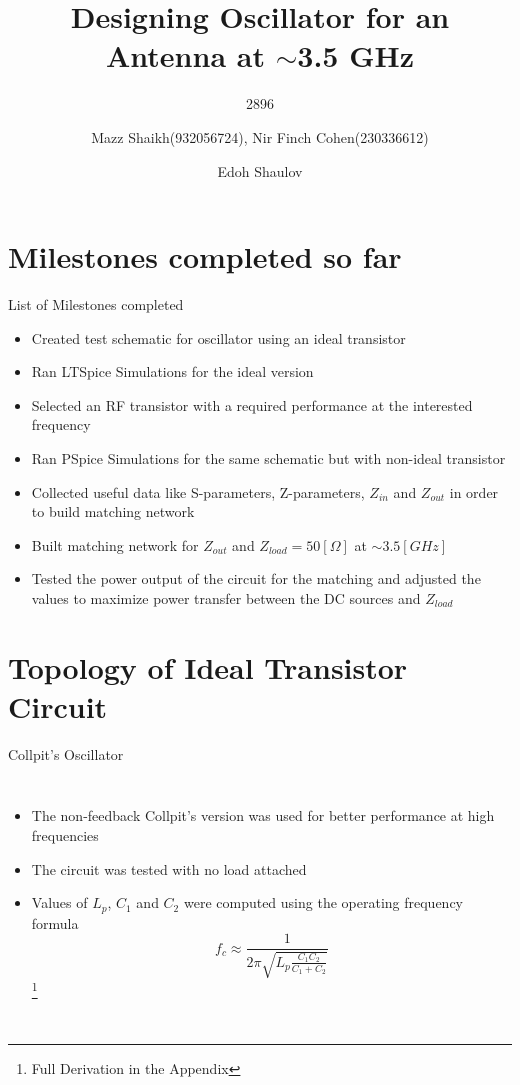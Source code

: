 \documentclass{beamer}
\title{Designing Oscillator for an Antenna at \(\sim\)3.5 GHz}
\date{}
\subtitle{2896}
\author{Mazz Shaikh(932056724), Nir Finch Cohen(230336612)}
\date{Edoh Shaulov}
\institute{Tel Aviv University}
\begin{document}
\maketitle


\section{Milestones completed so far}

\begin{frame}{List of Milestones completed}

\begin{itemize}
  \item<1-> Created test schematic for oscillator using an ideal transistor
  \item<2-> Ran LTSpice Simulations for the ideal version
  \item<3-> Selected an RF transistor with a required performance at the interested frequency
  \item<4-> Ran PSpice Simulations for the same schematic but with non-ideal transistor
  \item<5-> Collected useful data like S-parameters, Z-parameters, \(Z_{in}\) and \(Z_{out}\) in order to build matching network
  \item<6-> Built matching network for \(Z_{out}\) and \(Z_{load}=50[\Omega]\) at \(\sim3.5[GHz]\)
  \item<7-> Tested the power output of the circuit for the matching and adjusted the values to maximize power transfer between the DC sources and \(Z_{load}\)
\end{itemize}

\end{frame}


\section{Topology of Ideal Transistor Circuit}

\begin{frame}{Collpit's Oscillator}
\begin{columns}
  \begin{itemize}
    \item <1-> The non-feedback Collpit's version was used for better performance at high frequencies
    \item <2-> The circuit was tested with no load attached
    \item <3-> Values of \(L_p\), \(C_1\) and \(C_2\) were computed using the operating frequency formula \[f_c\approx\frac{1}{2\pi\sqrt{L_p\frac{C_1C_2}{C_1+C_2}}}\]\footnote{Full Derivation in the Appendix}
  \end{itemize}
\end{columns}

\end{frame}
\end{document}
